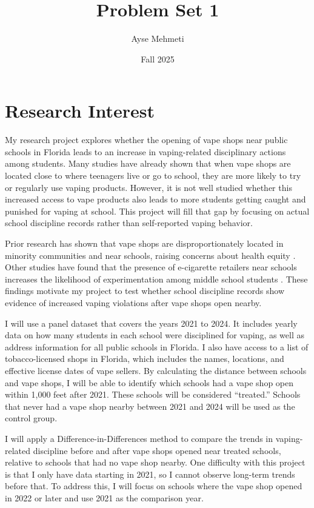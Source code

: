 \documentclass{article}
\title{Problem Set 1}
\author{Ayse Mehmeti}
\date{Fall 2025}
\begin{document}
\maketitle

\section*{Research Interest}

My research project explores whether the opening of vape shops near public schools in Florida leads to an increase in vaping-related disciplinary actions among students. Many studies have already shown that when vape shops are located close to where teenagers live or go to school, they are more likely to try or regularly use vaping products. However, it is not well studied whether this increased access to vape products also leads to more students getting caught and punished for vaping at school. This project will fill that gap by focusing on actual school discipline records rather than self-reported vaping behavior.

Prior research has shown that vape shops are disproportionately located in minority communities and near schools, raising concerns about health equity \citep{venugopal2020vape}. Other studies have found that the presence of e-cigarette retailers near schools increases the likelihood of experimentation among middle school students \citep{bostean2016ecig}. These findings motivate my project to test whether school discipline records show evidence of increased vaping violations after vape shops open nearby.

I will use a panel dataset that covers the years 2021 to 2024. It includes yearly data on how many students in each school were disciplined for vaping, as well as address information for all public schools in Florida. I also have access to a list of tobacco-licensed shops in Florida, which includes the names, locations, and effective license dates of vape sellers. By calculating the distance between schools and vape shops, I will be able to identify which schools had a vape shop open within 1,000 feet after 2021. These schools will be considered ``treated.'' Schools that never had a vape shop nearby between 2021 and 2024 will be used as the control group.

I will apply a Difference-in-Differences method to compare the trends in vaping-related discipline before and after vape shops opened near treated schools, relative to schools that had no vape shop nearby. One difficulty with this project is that I only have data starting in 2021, so I cannot observe long-term trends before that. To address this, I will focus on schools where the vape shop opened in 2022 or later and use 2021 as the comparison year.
\end{document}
